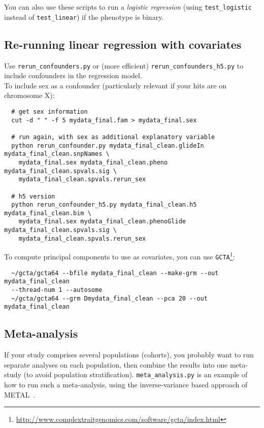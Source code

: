 \documentclass{article}
\begin{document}
You can also use these scripts to run a \textit{logistic regression}
(using \texttt{test\_logistic} instead of \texttt{test\_linear}) if the phenotype is binary.

\subsection{Re-running linear regression with covariates}
Use \texttt{rerun\_confounders.py} or (more efficient) \texttt{rerun\_confounders\_h5.py} to include confounders in the regression model.\\

To include sex as a confounder (particularly relevant if your hits are on chromosome X):\\

\begin{verbatim}
  # get sex information 
  cut -d " " -f 5 mydata_final.fam > mydata_final.sex
    
  # run again, with sex as additional explanatory variable 
  python rerun_confounder.py mydata_final_clean.glideIn mydata_final_clean.snpNames \
    mydata_final.sex mydata_final_clean.pheno mydata_final_clean.spvals.sig \
    mydata_final_clean.spvals.rerun_sex
   
  # h5 version
  python rerun_confounder_h5.py mydata_final_clean.h5 mydata_final_clean.bim \
    mydata_final.sex mydata_final_clean.phenoGlide mydata_final_clean.spvals.sig \
    mydata_final_clean.spvals.rerun_sex
\end{verbatim}

To compute principal components to use as covariates, you can use \texttt{GCTA}\footnote{\url{http://www.complextraitgenomics.com/software/gcta/index.html}}: \\

\begin{verbatim}
  ~/gcta/gcta64 --bfile mydata_final_clean --make-grm --out mydata_final_clean 
  --thread-num 1 --autosome
  ~/gcta/gcta64 --grm Dmydata_final_clean --pca 20 --out mydata_final_clean
\end{verbatim}

\subsection{Meta-analysis}
If your study comprises several populations (cohorts), you probably
want to run separate analyses on each population, then combine the
results into one meta-study (to avoid population stratification). \texttt{meta\_analysis.py} is an example of how to run
such a meta-analysis, using the inverse-variance based approach of METAL~\cite{willer10}.
\end{document}
